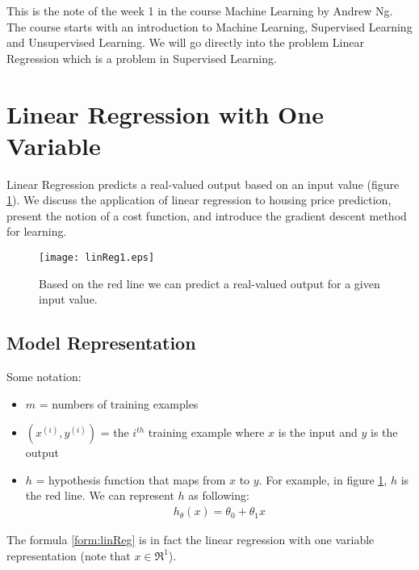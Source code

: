 This is the note of the week 1 in the course Machine Learning by Andrew Ng. The course starts with an introduction to Machine Learning, Supervised Learning and Unsupervised Learning. We will go directly into the problem Linear Regression which is a problem in Supervised Learning.
\section{Linear Regression with One Variable}
Linear Regression predicts a real-valued output based on an input value (figure \ref{fig:linReg1}). We discuss the application of linear regression to housing price prediction, present the notion of a cost function, and introduce the gradient descent method for learning.
\begin{figure}[!ht]
\centering
\texttt{[image: linReg1.eps]}
\caption[Linear Regression]{Based on the red line we can predict a real-valued output for a given input value.}
\label{fig:linReg1}
\end{figure}

\subsection{Model Representation}
Some notation:
\begin{itemize}
	\item $m$ = numbers of training examples
	\item $(x^{(i)}, y^{(i)})$ = the $i^{th}$ training example where $x$ is the input and $y$ is the output 
	\item $h$ = hypothesis function that maps from $x$ to $y$. For example, in figure \ref{fig:linReg1}, $h$ is the red line. We can represent $h$ as following:
	\begin{align}
		h_{\theta}(x) = \theta_{0} + \theta_{1}x  
		\label{form:linReg}
	\end{align}
\end{itemize}
The formula \eqref{form:linReg} is in fact the linear regression with one variable representation (note that $x \in \Re^1$).

